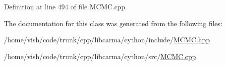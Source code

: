 Definition at line 494 of file M\-C\-M\-C.\-cpp.



The documentation for this class was generated from the following files\-:\begin{DoxyCompactItemize}
\item 
/home/vish/code/trunk/cpp/libcarma/cython/include/\hyperlink{_m_c_m_c_8hpp}{M\-C\-M\-C.\-hpp}\item 
/home/vish/code/trunk/cpp/libcarma/cython/src/\hyperlink{_m_c_m_c_8cpp}{M\-C\-M\-C.\-cpp}\end{DoxyCompactItemize}
